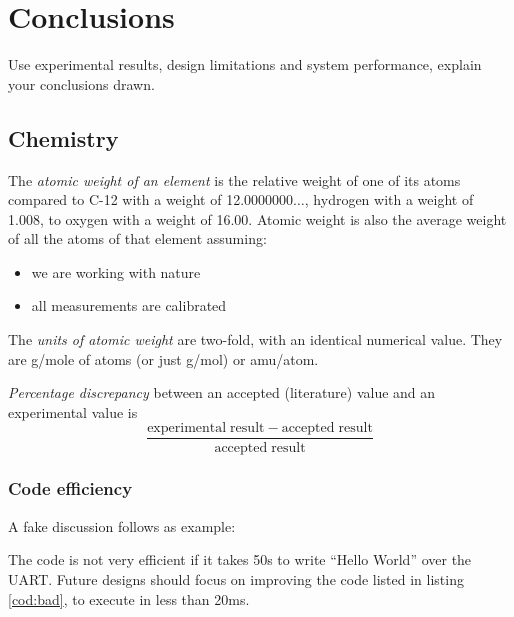 \documentclass[11pt,a4paper]{article}
\begin{document}
	\section{Conclusions}
	Use experimental results, design limitations and system performance, explain your conclusions drawn.
	
	\subsection{Chemistry}
	\begin{enumerate}
		\begin{item}
			The \emph{atomic weight of an element} is the relative weight of one of its atoms compared to C-12 with a weight of 12.0000000$\ldots$, hydrogen with a weight of 1.008, to oxygen with a weight of 16.00. Atomic weight is also the average weight of all the atoms of that element assuming:
			\begin{itemize}
				\item we are working with nature
				\item all measurements are calibrated
			\end{itemize}	
		\end{item}
		\begin{item}
			The \emph{units of atomic weight} are two-fold, with an identical numerical value. They are g/mole of atoms (or just g/mol) or amu/atom.
		\end{item}
		\begin{item}
			\emph{Percentage discrepancy} between an accepted (literature) value and an experimental value is
			\begin{equation}
			\frac{\mathrm{experimental\;result} - \mathrm{accepted\;result}}{\mathrm{accepted\;result}}
			\end{equation}
		\end{item}
	\end{enumerate}
	
	\subsubsection{Code efficiency}
	A fake discussion follows as example:
	
	The code is not very efficient if it takes 50s to write ``Hello World'' over the UART. Future designs should focus on improving the code listed in listing \ref{cod:bad}, to execute in less than 20ms.
	
\end{document}
